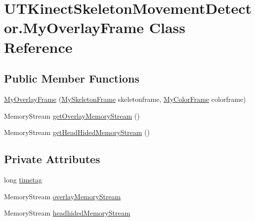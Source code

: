 \hypertarget{classUTKinectSkeletonMovementDetector_1_1MyOverlayFrame}{\section{U\-T\-Kinect\-Skeleton\-Movement\-Detector.\-My\-Overlay\-Frame Class Reference}
\label{classUTKinectSkeletonMovementDetector_1_1MyOverlayFrame}
}
\subsection*{Public Member Functions}
\begin{DoxyCompactItemize}
\item 
\hyperlink{classUTKinectSkeletonMovementDetector_1_1MyOverlayFrame_a7852ef2ac2396d8a8ae3500ba44c13b3}{My\-Overlay\-Frame} (\hyperlink{classUTKinectSkeletonMovementDetector_1_1MySkeletonFrame}{My\-Skeleton\-Frame} skeletonframe, \hyperlink{classUTKinectSkeletonMovementDetector_1_1MyColorFrame}{My\-Color\-Frame} colorframe)
\item 
Memory\-Stream \hyperlink{classUTKinectSkeletonMovementDetector_1_1MyOverlayFrame_aa9b454d2c1418cf9039cdd066543c069}{get\-Overlay\-Memory\-Stream} ()
\item 
Memory\-Stream \hyperlink{classUTKinectSkeletonMovementDetector_1_1MyOverlayFrame_a7c9d73f006e7ecd7bfeece1ad78f2a64}{get\-Head\-Hided\-Memory\-Stream} ()
\end{DoxyCompactItemize}
\subsection*{Private Attributes}
\begin{DoxyCompactItemize}
\item 
long \hyperlink{classUTKinectSkeletonMovementDetector_1_1MyOverlayFrame_a45b8f233c8c84ef288dbc2f335bfd838}{timetag}
\item 
Memory\-Stream \hyperlink{classUTKinectSkeletonMovementDetector_1_1MyOverlayFrame_aee8d39380ccdb77dd048f711703dbff0}{overlay\-Memory\-Stream}
\item 
Memory\-Stream \hyperlink{classUTKinectSkeletonMovementDetector_1_1MyOverlayFrame_ab4852fb3c692907a96b9e23572094e38}{headhided\-Memory\-Stream}
\end{DoxyCompactItemize}


